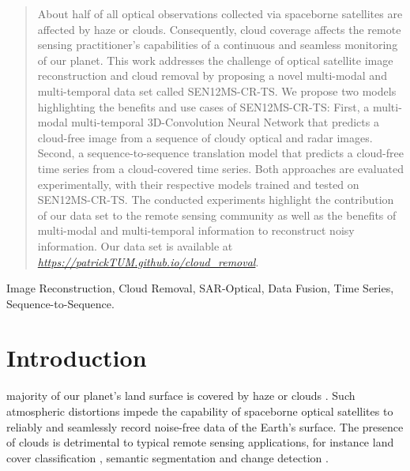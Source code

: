 \documentclass[journal]{IEEEtran}
\begin{document}
\maketitle

\begin{abstract}

    About half of all optical observations collected via spaceborne satellites are affected by haze or clouds. Consequently, cloud coverage affects the remote sensing practitioner's capabilities of a continuous and seamless monitoring of our planet. This work addresses the challenge of optical satellite  image reconstruction and cloud removal by proposing a novel multi-modal and multi-temporal data set called SEN12MS-CR-TS. We propose two models highlighting the benefits and use cases of SEN12MS-CR-TS: First, a multi-modal multi-temporal 3D-Convolution Neural Network that predicts a cloud-free image from a sequence of cloudy optical and radar images. Second, a sequence-to-sequence translation model that predicts a cloud-free time series from a cloud-covered time series. Both approaches are evaluated experimentally, with their respective models trained and tested on SEN12MS-CR-TS. The conducted experiments highlight the contribution of our data set to the remote sensing community as well as the benefits of multi-modal and multi-temporal information to reconstruct noisy information. Our data set is available at \textit{\url{https://patrickTUM.github.io/cloud_removal}}. \end{abstract}

\begin{IEEEkeywords}
Image Reconstruction, Cloud Removal, SAR-Optical, Data Fusion, Time Series, Sequence-to-Sequence.
\end{IEEEkeywords}


\IEEEpeerreviewmaketitle




\section{Introduction}

 majority of our planet's land surface is covered by haze or clouds \cite{King_Platnick_Menzel_Ackerman_Hubanks_2013}. Such atmospheric distortions impede the capability of spaceborne optical satellites to reliably and seamlessly record noise-free data of the Earth's surface. The presence of clouds is detrimental to typical remote sensing applications, for instance land cover classification \cite{schmitt2021remote}, semantic segmentation \cite{Rafique_Blanton_Jacobs, schmitt2020weakly} and change detection \cite{ebel2021fusing, saha2021self}.
\end{document}
